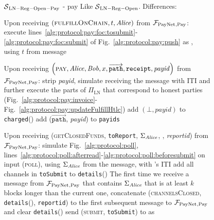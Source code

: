 \begin{figure}[H]
  \begin{simulatorbox}{$\mathcal{S}{}_{\mathrm{LN - Reg - Open - Pay}}$ - pay}
    Like $\mathcal{S}{}_{\mathrm{LN - Reg - Open}}$. Differences:
    \begin{algorithmic}[1]
      \State Upon receiving $\left(\textsc{fulfillOnChain}, t, \mathit{Alice}\right)$
      from $\mathcal{F}_{\mathrm{PayNet}}{}_{\mathrm{, Pay}}$:
      \Indent
        \State execute
        lines~\ref{alg:protocol:pay:foc:tosubmit}-\ref{alg:protocol:pay:foc:submit}
        of Fig.~\ref{alg:protocol:pay:push} as \alice{}, using $t$ from message
      \EndIndent
      \Statex

      \State Upon receiving $\left(\textsc{pay}, \mathit{Alice}, \mathit{Bob}, x,
      \overrightarrow{\mathtt{path}}, \mathtt{receipt}, \mathit{payid}\right)$
      from $\mathcal{F}_{\mathrm{PayNet}}{}_{\mathrm{, Pay}}$:
      \Indent
        \State strip \textit{payid}, simulate receiving the message with
        \alice{} ITI and further execute the parts of $\Pi_{\mathrm{LN}}$ that
        correspond to honest parties (Fig.~\ref{alg:protocol:pay:invoice}-
        Fig.~\ref{alg:protocol:pay:updateFulfillHtlc})
        \label{alg:sim:pay:simulate}
         
          \State add $\left(\bot, \mathit{payid}\right)$ to
          \texttt{charged}(\alice)
        \Else
          \State add ($\overrightarrow{\mathtt{path}}$, \textit{payid}) to
          \texttt{payids}
        \EndIf
      \EndIndent
      \Statex

      \State Upon receiving (\textsc{getClosedFunds}, \texttt{toReport},
      $\Sigma_{\mathit{Alice}}$, \alice, \textit{reportid}) from $\mathcal{F}_{\mathrm{PayNet}}{}_{\mathrm{,
      Pay}}$:
      \Indent
        \State simulate Fig.~\ref{alg:protocol:poll},
        lines~\ref{alg:protocol:poll:afterread}-\ref{alg:protocol:poll:beforesubmit}
        on input (\textsc{poll}), using $\Sigma_{\mathit{Alice}}$ from the message, with
        \alice's ITI
        \State add all channels in \texttt{toSubmit} to \texttt{details}(\alice)
        \State The first time we receive a message from $\mathcal{F}_{\mathrm{PayNet}}{}_{\mathrm{,
        Pay}}$ that contains $\Sigma_{\mathit{Alice}}$ that is at least $k$ blocks
        longer than the current one, concatenate (\textsc{channelsClosed},
        \texttt{details}(\alice), \texttt{reportid}) to the first subsequent
        message to $\mathcal{F}_{\mathrm{PayNet}}{}_{\mathrm{, Pay}}$ and clear
        \texttt{details}(\alice)
        \State send (\textsc{submit}, \texttt{toSubmit}) to \ledger{} as \alice
      \EndIndent
      \Statex


\end{algorithmic}
\end{simulatorbox}
\end{figure}
